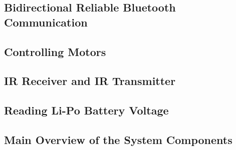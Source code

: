 \subsection{Bidirectional Reliable Bluetooth Communication} \label{sec_bluetooth_comm}

\subsection{Controlling Motors} \label{sec_controlling_motors}

\subsection{IR Receiver and IR Transmitter} \label{sec_ir_rx_tx}

\subsection{Reading Li-Po Battery Voltage} \label{sec_read_lipo_voltage}

\subsection{Main Overview of the System Components} \label{main_system_components}



